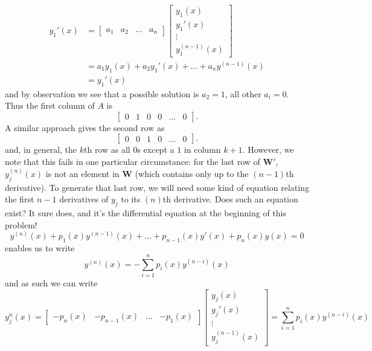 \documentclass{article}
\begin{document}
\begin{equation*}
    \begin{aligned}
        y_1'(x) &=
        \begin{bmatrix}
            a_1 &a_2 &\dots &a_n
        \end{bmatrix}
        \begin{bmatrix}
            y_1(x) \\ y_1'(x) \\ \vdots \\ y_1^{(n-1)}(x)
        \end{bmatrix} \\
        &= a_1y_1(x) + a_2y_1'(x) + \dots + a_ny^{(n-1)}(x) \\
        &= y_1'(x)
    \end{aligned}
\end{equation*}
and by observation we see that a possible solution is $a_2 = 1$, all other $a_i = 0$. Thus the first column of $A$ is 
\begin{equation*}
    \begin{bmatrix}
        0 &1 & 0 & 0 & \dots & 0
    \end{bmatrix}.
\end{equation*}
A similar approach gives the second row as 
\begin{equation*}
    \begin{bmatrix}
        0 & 0 & 1 & 0 & \dots & 0
    \end{bmatrix}.
\end{equation*}
and, in general, the $k$th row as all $0$s except a $1$ in column $k+1$. However, we note that this fails in one particular circumstance: for the last row of $\mathbf{W'}$, $y_j^{(n)}(x)$ is not an element in $\mathbf{W}$ (which contains only up to the $(n-1)$th derivative). To generate that last row, we will need some kind of equation relating the first $n-1$ derivatives of $y_j$ to its $(n)$th derivative. Does such an equation exist? It sure does, and it's the differential equation at the beginning of this problem!
\begin{equation*}
    y^{(n)}(x) + p_1(x) y^{(n-1)}(x) + \dots + p_{n-1}(x)y'(x) + p_n(x)y(x) = 0
\end{equation*}
enables us to write 
\begin{equation*}
    y^{(n)}(x) = -\sum_{i=1}^{n}p_i(x)y^{(n-i)}(x)
\end{equation*}
and as such we can write 
\begin{equation*}
    y_j^{n}(x) = \begin{bmatrix}
        -p_n(x) & -p_{n-1}(x) &\dots &-p_1(x)
    \end{bmatrix}
    \begin{bmatrix}
        y_j(x) \\ y_j'(x) \\ \vdots \\ y_j^{(n-1)}(x)
    \end{bmatrix} 
    = \sum_{i=1}^{n}p_i(x)y^{(n-i)}(x)
\end{equation*}
\end{document}
